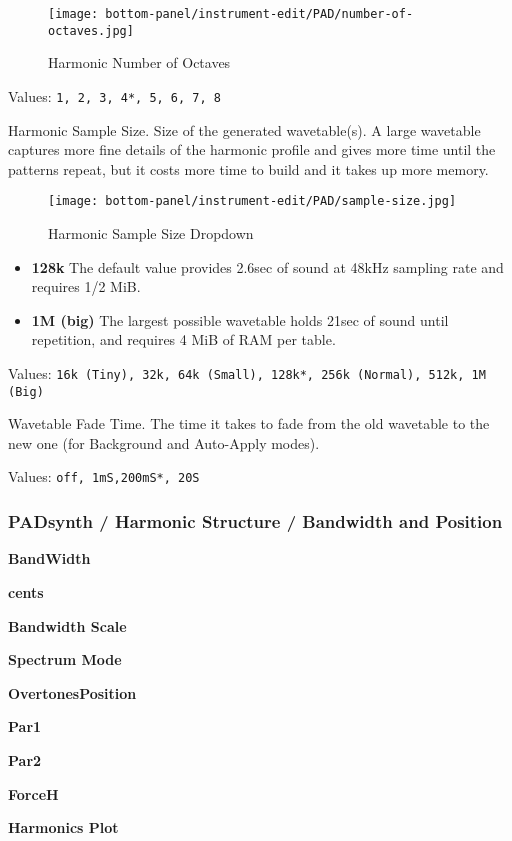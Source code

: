 \begin{figure}[H]
   \centering
   \texttt{[image: bottom-panel/instrument-edit/PAD/number-of-octaves.jpg]}
   \caption{Harmonic Number of Octaves}
   \label{fig:padsynth_harmonic_number_of_octaves}
\end{figure}

   Values: \texttt{1, 2, 3, 4*, 5, 6, 7, 8}

   Harmonic Sample Size.
   Size of the generated wavetable(s). A large wavetable captures more fine
   details of the harmonic profile and gives more time until the patterns repeat,
   but it costs more time to build and it takes up more memory.

\begin{figure}[H]
   \centering
   \texttt{[image: bottom-panel/instrument-edit/PAD/sample-size.jpg]}
   \caption{Harmonic Sample Size Dropdown}
   \label{fig:padsynth_harmonic_sample_size_dropdown}
\end{figure}

   \begin{itemize}
      \item \textbf{128k}
         The default value provides 2.6sec of sound at 48kHz sampling rate and
         requires 1/2 MiB.
      \item \textbf{1M (big)}
         The largest possible wavetable holds 21sec of sound until repetition, and
         requires 4 MiB of RAM per table.

   \end{itemize}

   Values: \texttt{16k (Tiny), 32k, 64k (Small), 128k*, 256k (Normal), 512k, 1M
   (Big)}

   Wavetable Fade Time.
   The time it takes to fade from the old wavetable to the new one (for Background
   and Auto-Apply modes).

   Values: \texttt{off, 1mS,200mS*, 20S}

\subsubsection{PADsynth / Harmonic Structure / Bandwidth and Position}
\label{subsubsec:padsynth_harmonic_structure_bw_and_pos}

   \begin{enumber}
      \item \textbf{BandWidth}
      \item \textbf{cents}
      \item \textbf{Bandwidth Scale}
      \item \textbf{Spectrum Mode}
      \item \textbf{OvertonesPosition}
      \item \textbf{Par1}
      \item \textbf{Par2}
      \item \textbf{ForceH}
      \item \textbf{Harmonics Plot}
   \end{enumber}

